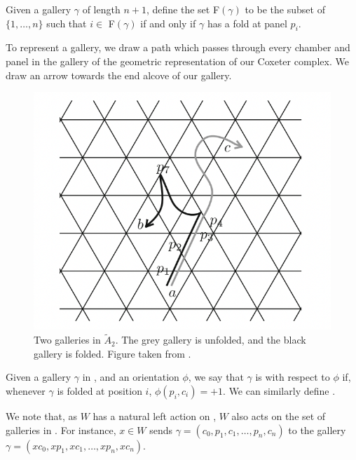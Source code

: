 \documentclass[11pt]{article}
\begin{document}
\begin{definition}
    Given a gallery $\gamma$ of length $n+1$, define the set F$(\gamma)$ to be the subset of $\{1,\hdots ,n\}$ such that $i\in$ F$(\gamma)$ if and only if $\gamma$ has a fold at panel $p_i$. 
\end{definition}

To represent a gallery, we draw a path which passes through every chamber and panel in the gallery of the geometric representation of our Coxeter complex. We draw an arrow towards the end alcove of our gallery. 

\begin{figure}[!htbp]
    \begin{center}
    \includegraphics[scale=0.4]{Screenshot 2023-04-18 at 17.03.05.png}
    \end{center}
    \caption{Two galleries in $\tilde{A}_2$. The grey gallery is unfolded, and the black gallery is folded. Figure taken from \cite[p.127]{SHA}.}
\end{figure}

\begin{definition}
    Given a gallery $\gamma$ in \sg, and an orientation $\phi$, we say that $\gamma$ is  with respect to $\phi$ if, whenever $\gamma$ is folded at position $i$, $\phi(p_i,c_i)=+1$.  We can similarly define .
\end{definition}

We note that, as $W$ has a natural left action on \sg, $W$ also acts on the set of galleries in \sg. For instance, $x\in W$ sends $\gamma = (c_0,p_1,c_1,\hdots ,p_n,c_n)$ to the gallery $\gamma = (xc_0,xp_1,xc_1,\hdots ,xp_n,xc_n)$. 
\end{document}
